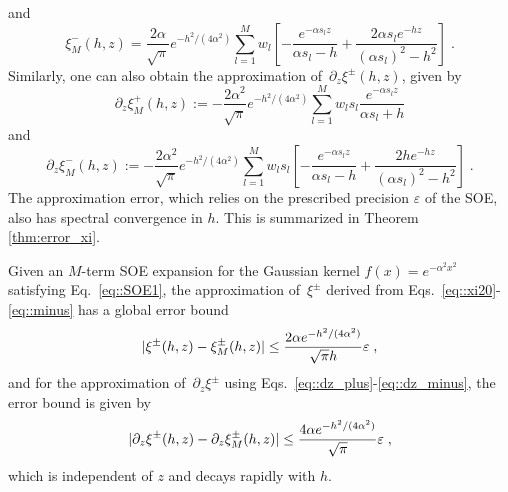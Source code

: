and
\begin{equation}\label{eq::minus}
	\xi_{M}^{-}(h, z) = \frac{2 \alpha}{\sqrt{\pi}} e^{-h^2/(4 \alpha^2)} \sum_{l = 1}^M w_l \left[ - \frac{e^{-\alpha s_l z}}{\alpha s_l - h} + \frac{2\alpha s_l e^{- hz}} {(\alpha s_l)^2 - h^2} \right] \;.
\end{equation}
Similarly, one can also obtain the approximation of~$\partial_z \xi^{\pm}(h,z)$, given by
\begin{equation}\label{eq::dz_plus}
	\partial_z \xi_{M}^{+}(h, z) := - \frac{2 \alpha^2 }{\sqrt{\pi}} e^{-h^2/(4 \alpha^2)} \sum_{l = 1}^M w_l s_l \frac{e^{- \alpha s_l z}}{\alpha s_l + h } 
\end{equation}
and
\begin{equation}\label{eq::dz_minus}
	\partial_z \xi_{M}^{-}(h, z) := - \frac{2 \alpha^2}{\sqrt{\pi}} e^{-h^2/(4 \alpha^2)} \sum_{l = 1}^M w_l s_l \left[ - \frac{e^{-\alpha s_lz}}{\alpha s_l - h} + \frac{2 h e^{- hz}} {(\alpha s_l )^2 - h^2} \right] \;.
\end{equation}
The approximation error, which relies on the prescribed precision $\varepsilon$ of the SOE, also has spectral convergence in $h$.
This is summarized in Theorem \ref{thm:error_xi}.

\begin{thm}\label{thm:error_xi}
	Given an $M$-term SOE expansion for the Gaussian kernel $f(x)=e^{-\alpha^2x^2}$ satisfying Eq.~\eqref{eq::SOE1}, the approximation of~$\xi^{\pm}$ derived from Eqs.~\eqref{eq::xi20}-\eqref{eq::minus} has a global error bound
	\begin{equation}\label{eq::bound_xi}
		\lvert\xi^{\pm}(h,z) - \xi_{M}^{\pm}(h, z)\rvert \leq \frac{2 \alpha e^{-h^2/(4 \alpha^2)}}{\sqrt{\pi} h} \varepsilon\;,
	\end{equation}
	and for the approximation of~$\partial_z \xi^{\pm}$ using Eqs.~\eqref{eq::dz_plus}-\eqref{eq::dz_minus}, the error bound is given by
	\begin{equation}\label{eq::bound_dz_xi}
		\lvert\partial_z \xi^{\pm}(h,z) - \partial_z \xi_{M}^{\pm}(h, z)\rvert \leq \frac{4 \alpha e^{-h^2/(4 \alpha^2)}}{\sqrt{\pi}} \varepsilon\;,
	\end{equation}
	which is independent of $z$ and decays rapidly with $h$.
\end{thm}

